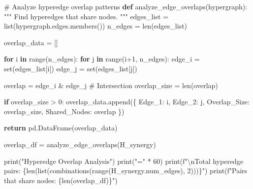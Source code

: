 \documentclass[
  11pt,
  letterpaper,
  oneside,
  openany]{book}
\newenvironment{Shaded}{\begin{snugshade}}{\end{snugshade}}
\newcommand{\BuiltInTok}[1]{\textcolor[rgb]{0.00,0.23,0.31}{#1}}
\newcommand{\CharTok}[1]{\textcolor[rgb]{0.13,0.47,0.30}{#1}}
\newcommand{\CommentTok}[1]{\textcolor[rgb]{0.37,0.37,0.37}{#1}}
\newcommand{\ControlFlowTok}[1]{\textcolor[rgb]{0.00,0.23,0.31}{\textbf{#1}}}
\newcommand{\DecValTok}[1]{\textcolor[rgb]{0.68,0.00,0.00}{#1}}
\newcommand{\KeywordTok}[1]{\textcolor[rgb]{0.00,0.23,0.31}{\textbf{#1}}}
\newcommand{\NormalTok}[1]{\textcolor[rgb]{0.00,0.23,0.31}{#1}}
\newcommand{\OperatorTok}[1]{\textcolor[rgb]{0.37,0.37,0.37}{#1}}
\newcommand{\SpecialCharTok}[1]{\textcolor[rgb]{0.37,0.37,0.37}{#1}}
\newcommand{\SpecialStringTok}[1]{\textcolor[rgb]{0.13,0.47,0.30}{#1}}
\newcommand{\StringTok}[1]{\textcolor[rgb]{0.13,0.47,0.30}{#1}}
\begin{document}
\begin{Shaded}
\begin{Highlighting}[]
\CommentTok{\# Analyze hyperedge overlap patterns}
\KeywordTok{def}\NormalTok{ analyze\_edge\_overlaps(hypergraph):}
    \CommentTok{"""}
\CommentTok{    Find hyperedges that share nodes.}
\CommentTok{    """}
\NormalTok{    edges\_list }\OperatorTok{=} \BuiltInTok{list}\NormalTok{(hypergraph.edges.members())}
\NormalTok{    n\_edges }\OperatorTok{=} \BuiltInTok{len}\NormalTok{(edges\_list)}
    
\NormalTok{    overlap\_data }\OperatorTok{=}\NormalTok{ []}
    
    \ControlFlowTok{for}\NormalTok{ i }\KeywordTok{in} \BuiltInTok{range}\NormalTok{(n\_edges):}
        \ControlFlowTok{for}\NormalTok{ j }\KeywordTok{in} \BuiltInTok{range}\NormalTok{(i}\OperatorTok{+}\DecValTok{1}\NormalTok{, n\_edges):}
\NormalTok{            edge\_i }\OperatorTok{=} \BuiltInTok{set}\NormalTok{(edges\_list[i])}
\NormalTok{            edge\_j }\OperatorTok{=} \BuiltInTok{set}\NormalTok{(edges\_list[j])}
            
\NormalTok{            overlap }\OperatorTok{=}\NormalTok{ edge\_i }\OperatorTok{\&}\NormalTok{ edge\_j  }\CommentTok{\# Intersection}
\NormalTok{            overlap\_size }\OperatorTok{=} \BuiltInTok{len}\NormalTok{(overlap)}
            
            \ControlFlowTok{if}\NormalTok{ overlap\_size }\OperatorTok{\textgreater{}} \DecValTok{0}\NormalTok{:}
\NormalTok{                overlap\_data.append(\{}
                    \StringTok{\textquotesingle{}Edge\_1\textquotesingle{}}\NormalTok{: i,}
                    \StringTok{\textquotesingle{}Edge\_2\textquotesingle{}}\NormalTok{: j,}
                    \StringTok{\textquotesingle{}Overlap\_Size\textquotesingle{}}\NormalTok{: overlap\_size,}
                    \StringTok{\textquotesingle{}Shared\_Nodes\textquotesingle{}}\NormalTok{: overlap}
\NormalTok{                \})}
    
    \ControlFlowTok{return}\NormalTok{ pd.DataFrame(overlap\_data)}

\NormalTok{overlap\_df }\OperatorTok{=}\NormalTok{ analyze\_edge\_overlaps(H\_synergy)}

\BuiltInTok{print}\NormalTok{(}\StringTok{"Hyperedge Overlap Analysis"}\NormalTok{)}
\BuiltInTok{print}\NormalTok{(}\StringTok{"="} \OperatorTok{*} \DecValTok{60}\NormalTok{)}
\BuiltInTok{print}\NormalTok{(}\SpecialStringTok{f"}\CharTok{\textbackslash{}n}\SpecialStringTok{Total hyperedge pairs: }\SpecialCharTok{\{}\BuiltInTok{len}\NormalTok{(}\BuiltInTok{list}\NormalTok{(combinations(}\BuiltInTok{range}\NormalTok{(H\_synergy.num\_edges), }\DecValTok{2}\NormalTok{)))}\SpecialCharTok{\}}\SpecialStringTok{"}\NormalTok{)}
\BuiltInTok{print}\NormalTok{(}\SpecialStringTok{f"Pairs that share nodes: }\SpecialCharTok{\{}\BuiltInTok{len}\NormalTok{(overlap\_df)}\SpecialCharTok{\}}\SpecialStringTok{"}\NormalTok{)}


\end{Highlighting}
\end{Shaded}
\end{document}
